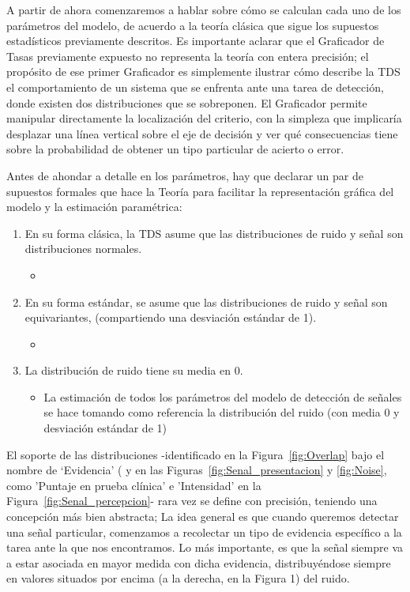 A partir de ahora comenzaremos a hablar sobre cómo se calculan cada uno de los parámetros del modelo, de acuerdo a la teoría clásica que sigue los supuestos estadísticos previamente descritos.  Es importante aclarar que el Graficador de Tasas previamente expuesto no representa la teoría con entera precisión; el propósito de ese primer Graficador es simplemente ilustrar cómo describe la TDS el comportamiento de un sistema que se enfrenta ante una tarea de detección, donde existen dos distribuciones que se sobreponen. El Graficador permite manipular directamente la localización del criterio, con la simpleza que implicaría desplazar una línea vertical sobre el eje de decisión y ver qué consecuencias tiene sobre la probabilidad de obtener un tipo particular de acierto o error.


Antes de ahondar a detalle en los parámetros, hay que declarar un par de supuestos formales que hace la Teoría para facilitar la representación gráfica del modelo y la estimación paramétrica:

\begin{enumerate}
\item En su forma clásica, la TDS asume que las distribuciones de ruido y señal son distribuciones normales.
  \begin{itemize}
  \item 
  \end{itemize}
\item En su forma estándar, se asume que las distribuciones de ruido y señal son equivariantes, (compartiendo una desviación estándar de 1).
  \begin{itemize}
  \item 
  \end{itemize}
\item La distribución de ruido tiene su media en 0. 
  \begin{itemize}
  \item La estimación de todos los parámetros del modelo de detección de señales se hace tomando como referencia la distribución del ruido (con  media 0 y desviación estándar de 1)
  \end{itemize}
\end{enumerate}








El soporte de las distribuciones -identificado en la Figura~\ref{fig:Overlap} bajo el nombre de ‘Evidencia’ ( y en las Figuras~\ref{fig:Senal_presentacion} y \ref{fig:Noise}, como 'Puntaje en prueba clínica' e 'Intensidad' en la Figura~\ref{fig:Senal_percepcion}- rara vez se define con precisión,  teniendo una concepción más bien abstracta; La idea general es que cuando queremos detectar una señal particular, comenzamos a recolectar un tipo de evidencia específico a la tarea ante la que nos encontramos. Lo más importante, es que la señal siempre va a estar asociada en mayor medida con dicha evidencia, distribuyéndose siempre en valores situados por encima (a la derecha, en la Figura 1) del ruido.\\
 



